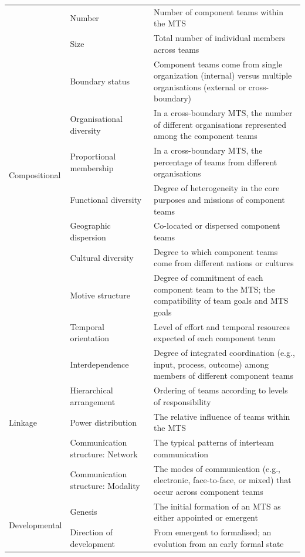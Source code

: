 \begin{center}
\begin{longtable}{ | p{2.5cm} | p{4cm} | p{8cm} | }
	\multirow{10}{*}{Compositional} & Number & Number of component teams within the MTS \\ \cline{2-3}
 	& Size & Total number of individual members across teams \\ \cline{2-3}
 	& Boundary status & Component teams come from single organization (internal) versus multiple organisations (external or cross-boundary) \\ \cline{2-3}
 	& Organisational diversity & In a cross-boundary MTS, the number of different organisations represented among the component teams \\ \cline{2-3}
	& Proportional membership & In a cross-boundary MTS, the percentage of teams from different organisations \\ \cline{2-3}
	& Functional diversity & Degree of heterogeneity in the core purposes and missions of component teams \\ \cline{2-3}
	& Geographic dispersion & Co-located or dispersed component teams \\ \cline{2-3}
	& Cultural diversity & Degree to which component teams come from different nations or cultures \\ \cline{2-3}
	& Motive structure & Degree of commitment of each component team to the MTS; the compatibility of team goals and MTS goals \\ \cline{2-3}
	& Temporal orientation & Level of effort and temporal resources expected of each component team \\ \cline{2-3}
\hline
	\multirow{5}{*}{Linkage} & Interdependence & Degree of integrated coordination (e.g., input, process, outcome) among members of different component teams \\ \cline{2-3}
 	& Hierarchical arrangement & Ordering of teams according to levels of responsibility \\ \cline{2-3}
 	& Power distribution & The relative influence of teams within the MTS \\ \cline{2-3}
	& Communication structure: Network & The typical patterns of interteam communication \\ \cline{2-3}
	& Communication structure: Modality & The modes of communication (e.g., electronic, face-to-face, or mixed) that occur across component teams \\ \cline{2-3}
\hline
	\multirow{6}{*}{Developmental} & Genesis & The initial formation of an MTS as either appointed or emergent \\ \cline{2-3}
 	& Direction of development & From emergent to formalised; an evolution from an early formal state \\ \cline{2-3}

\end{longtable}
\end{center}
